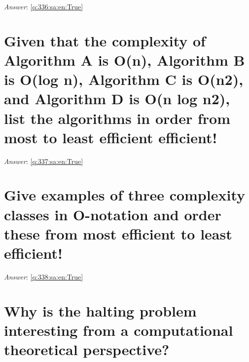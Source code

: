 \documentclass[a4paper,11pt,oneside]{book}
\begin{document}
\begin{sloppypar}
\label{q:336:sa:en:False}

\vspace{2cm}

\noindent\makebox[\textwidth]{\hrulefill}

\vspace{1cm}

\textit{Answer}: \autoref{q:336:sa:en:True}



\section{Given that the complexity of Algorithm A is O(n), Algorithm B is O(log n), Algorithm C is O(n2), and Algorithm D is O(n log n2), list the algorithms in order from most to least efficient efficient!}

\label{q:337:sa:en:False}

\vspace{2cm}

\noindent\makebox[\textwidth]{\hrulefill}

\vspace{1cm}

\textit{Answer}: \autoref{q:337:sa:en:True}



\section{Give examples of three complexity classes in O-notation and order these from most efficient to least efficient!}

\label{q:338:sa:en:False}

\vspace{2cm}

\noindent\makebox[\textwidth]{\hrulefill}

\vspace{1cm}

\textit{Answer}: \autoref{q:338:sa:en:True}



\section{Why is the halting problem interesting from a computational theoretical perspective?}

\label{q:339:sa:en:False}

\vspace{2cm}

\noindent\makebox[\textwidth]{\hrulefill}


\end{sloppypar}
\end{document}
